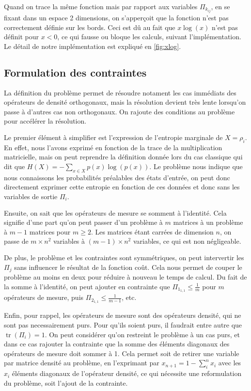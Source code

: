 \documentclass[12pt,a4paper]{article}
\DeclareMathOperator{\tr}{tr}
\begin{document}
    Quand on trace la même fonction mais par rapport aux variables $\Pi_{k_{ij}}$, en se fixant dans un espace 2 dimensions, on s'apperçoit que la fonction n'est pas correctement définie sur les bords. Ceci est dû au fait que $x\log(x)$ n'est pas définit pour $x < 0$, ce qui fausse ou bloque les calculs, suivant l'implémentation. Le détail de notre implémentation est expliqué en \ref{fig:xlog}. %

    \medbreak

    \subsection*{Formulation des contraintes}

    La définition du problème permet de résoudre notament les cas immédiats des opérateurs de densité orthogonaux, mais la résolution devient très lente lorsqu'on passe à d'autres cas non orthogonaux. On rajoute des conditions au problème pour accélérer la résolution.

    Le premier élément à simplifier est l'expression de l'entropie marginale de $X=\rho_i$. En effet, nous l'avons exprimé en fonction de la trace de la multiplication matricielle, mais on peut reprendre la définition donnée lors du cas classique qui dit que $ H(X) = -\displaystyle \sum_{x \in X} p(x) \log(p(x))$. Le problème nous indique que nous connaissons les probabilités préalables des états d'entrée, on peut donc directement exprimer cette entropie en fonction de ces données et donc sans les variables de sortie $\Pi_i$.

    Ensuite, on sait que les opérateurs de mesure se somment à l'identité. Cela signifie d'une part qu'on peut passer d'un problème à $m$ matrices à un problème à $m-1$ matrices pour $m \geq 2$. Les matrices étant carrées de dimension $n$, on passe de $m \times n^2$ variables à $(m - 1) \times n^2$ variables, ce qui est non négligeable.

    De plus, le problème et les contraintes sont symmétriques, on peut intervertir les $\Pi_j$ sans influencer le résultat de la fonction coût. Cela nous permet de couper le problème au moins en deux pour réduire à nouveau le temps de calcul. Du fait de la somme à l'identité, on peut ajouter en contrainte que $\Pi_{1_{1, 1}} \leq \frac{1}{m}$ pour $m$ opérateurs de mesure, puis $\Pi_{2_{1, 1}} \leq \frac{1}{m-1}$, etc.

    Enfin, pour rappel, les opérateurs de mesure sont des opérateurs densité, qui ne sont pas necessairement purs. Pour qu'ils soient purs, il faudrait entre autre que $\tr(\Pi_i) = 1$. On peut considérer qu'on restreint le problème à un cas purs, et dans ce cas rajouter la contrainte que la somme des éléments diagonaux des opérateurs de mesure doit sommer à 1. Cela permet soit de retirer une variable par matrice densité au problème, en l'exprimant par $x_{n+1} = 1 - \displaystyle \sum_{i}^{n} x_i$ avec les $x_i$ éléments diagonaux de l'opérateur densité, ce qui nécessite une reformulation du problème, soit l'ajout de la contrainte.
\end{document}
